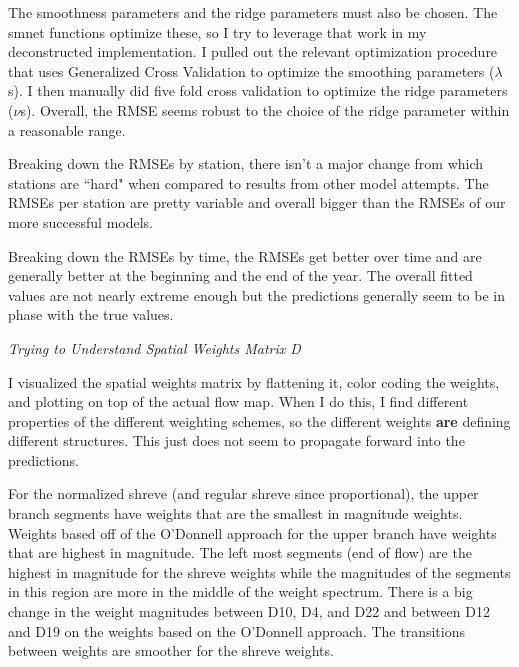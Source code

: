\documentclass[12pt]{amsart}
\begin{document}
The smoothness parameters and the ridge parameters must also be chosen. The smnet functions optimize these, so I try to leverage that work in my deconstructed implementation. I pulled out the relevant optimization procedure that uses Generalized Cross Validation to optimize the smoothing parameters ($\lambda$s). I then manually did five fold cross validation to optimize the ridge parameters ($\nu$s). Overall, the RMSE seems robust to the choice of the ridge parameter within a reasonable range. 

Breaking down the RMSEs by station, there isn't a major change from which stations are ``hard" when compared to results from other model attempts. The RMSEs per station are pretty variable and overall bigger than the RMSEs of our more successful models. 

Breaking down the RMSEs by time, the RMSEs get better over time and are generally better at the beginning and the end of the year. The overall fitted values are not nearly extreme enough but the predictions generally seem to be in phase with the true values.

\textit{Trying to Understand Spatial Weights Matrix D}

I visualized the spatial weights matrix by flattening it, color coding the weights, and plotting on top of the actual flow map. When I do this, I find different properties of the different weighting schemes, so the different weights \textbf{are} defining different structures. This just does not seem to propagate forward into the predictions.


For the normalized shreve (and regular shreve since proportional), the upper branch segments have weights that are the smallest in magnitude weights. Weights based off of the O'Donnell approach for the upper branch have weights that are highest in magnitude.  The left most segments (end of flow) are the highest in magnitude for the shreve weights while the magnitudes of the segments in this region are more in the middle of the weight spectrum. There is a big change in the weight magnitudes between D10, D4, and D22 and between D12 and D19 on the weights based on the O'Donnell approach. The transitions between weights are smoother for the shreve weights.









\textbf{}
\end{document}
